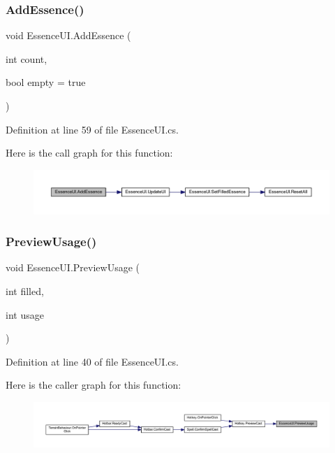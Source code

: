 \subsubsection{\texorpdfstring{AddEssence()}{AddEssence()}}
{\footnotesize\ttfamily void Essence\+U\+I.\+Add\+Essence (\begin{DoxyParamCaption}\item[{int}]{count,  }\item[{bool}]{empty = {\ttfamily true} }\end{DoxyParamCaption})}



Definition at line 59 of file Essence\+U\+I.\+cs.

Here is the call graph for this function\+:
\nopagebreak
\begin{figure}[H]
\begin{center}
\leavevmode
\includegraphics[width=350pt]{class_essence_u_i_a1fd3a11e5b47cd87758d337fe1f61384_cgraph}
\end{center}
\end{figure}
\mbox{\label{class_essence_u_i_abe39202e5f4c5134bd6a16ddfd8bb017}} 
\subsubsection{\texorpdfstring{PreviewUsage()}{PreviewUsage()}}
{\footnotesize\ttfamily void Essence\+U\+I.\+Preview\+Usage (\begin{DoxyParamCaption}\item[{int}]{filled,  }\item[{int}]{usage }\end{DoxyParamCaption})}



Definition at line 40 of file Essence\+U\+I.\+cs.

Here is the caller graph for this function\+:
\nopagebreak
\begin{figure}[H]
\begin{center}
\leavevmode
\includegraphics[width=350pt]{class_essence_u_i_abe39202e5f4c5134bd6a16ddfd8bb017_icgraph}
\end{center}
\end{figure}
\mbox{\label{class_essence_u_i_a39b3c1ec97a29130e2e8ab4050921ed6}} 

